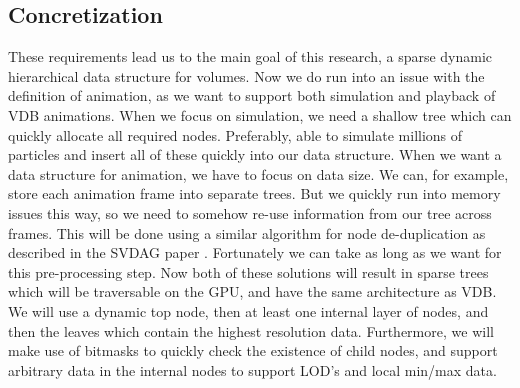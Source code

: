 \subsection{Concretization}\label{REQUIREMENTS:concretization}
These requirements lead us to the main goal of this research, a sparse dynamic hierarchical data structure for volumes. Now we do run into an issue with the definition of animation, as we want to support both simulation and playback of VDB animations. When we focus on simulation, we need a shallow tree which can quickly allocate all required nodes. Preferably, able to simulate millions of particles and insert all of these quickly into our data structure. When we want a data structure for animation, we have to focus on data size. We can, for example, store each animation frame into separate trees. But  we quickly run into memory issues this way, so we need to somehow re-use information from our tree across frames. This will be done using a similar algorithm for node de-duplication as described in the SVDAG paper \cite{kampe2013high}. Fortunately we can take as long as we want for this pre-processing step. Now both of these solutions will result in sparse trees which will be traversable on the GPU, and have the same architecture as VDB. We will use a dynamic top node, then at least one internal layer of nodes, and then the leaves which contain the highest resolution data. Furthermore, we will make use of bitmasks to quickly check the existence of child nodes, and support arbitrary data in the internal nodes to support LOD's and local min/max data. 